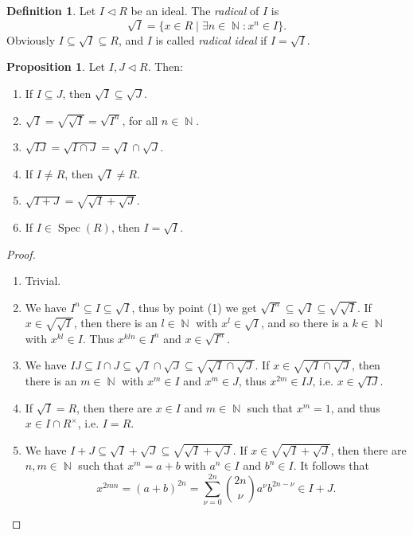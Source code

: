 \documentclass[12pt,a4paper]{report}
\theoremstyle{definition}
\newtheorem{proposition}[theorem]{Proposition}
\newtheorem{defn}[theorem]{Definition}
\theoremstyle{num.custom-title}
\DeclareMathOperator{\N}{\mathbb{N}}
\DeclareMathOperator{\sse}{\subseteq}
\DeclareMathOperator{\Spec}{Spec}
\begin{document}
\begin{defn}
Let $I \lhd R$ be an ideal. The \emph{radical} of $I$ is
\[
\sqrt{I} = \{ x \in R \mid \exists n \in \N \colon x^n \in I \}.
\]
Obviously $I \sse \sqrt{I} \sse R$, and $I$ is called \emph{radical ideal} if $I=\sqrt{I}$.
\end{defn}

\begin{proposition}
Let $I,J \lhd R$. Then:
\begin{enumerate}
\item If $I \sse J$, then $\sqrt{I} \sse \sqrt{J}$.
\item $\sqrt{I} = \sqrt{\sqrt{I}} = \sqrt{I^n}$, for all $n \in \N$.
\item $\sqrt{IJ} = \sqrt{I \cap J} = \sqrt{I} \cap \sqrt{J}$.
\item If $I \neq R$, then $\sqrt{I} \neq R$.
\item $\sqrt{I +J} = \sqrt{\sqrt{I}+\sqrt{J}}$.
\item If $I \in \Spec(R)$, then $I = \sqrt{I}$.
\end{enumerate}
\begin{proof}\ 
\begin{enumerate}
\item Trivial.
\item We have $I^n \sse I \sse \sqrt{I}$, thus by point (1) we get $\sqrt{I^n} \sse \sqrt{I} \sse \sqrt{\sqrt{I}}$. If $x \in \sqrt{\sqrt{I}}$, then there is an $l \in \N$ with $x^l \in \sqrt{I}$, and so there is a $k \in \N$ with $x^{kl} \in I$. Thus $x^{kln} \in I^n$ and $x \in \sqrt{I^n}$.
\item We have $IJ \sse I \cap J \sse \sqrt{I} \cap \sqrt{J} \sse \sqrt{\sqrt{I} \cap \sqrt{J}}$. If $x \in \sqrt{\sqrt{I} \cap \sqrt{J}}$, then there is an $m \in \N$ with $x^m \in I$ and $x^m \in J$, thus $x^{2m} \in IJ$, i.e. $x \in \sqrt{IJ}$.
\item If $\sqrt{I} = R$, then there are $x \in I$ and $m \in \N$ such that $x^m = 1$, and thus $x \in I \cap R^\times$, i.e. $I=R$.
\item We have $I+J \sse \sqrt{I} + \sqrt{J} \sse \sqrt{\sqrt{I}+\sqrt{J}}$. If $x \in \sqrt{\sqrt{I}+\sqrt{J}}$, then there are $n,m \in \N$ such that $x^m = a+b$ with $a^n \in I$ and $b^n \in I$. It follows that
\[
x^{2mn} = (a+b)^{2n} = \sum_{\nu=0}^{2n} \binom{2n}{\nu} a^\nu b^{2n-\nu} \in I+J.
\]
\end{enumerate}
\end{proof}
\end{proposition}
\end{document}
